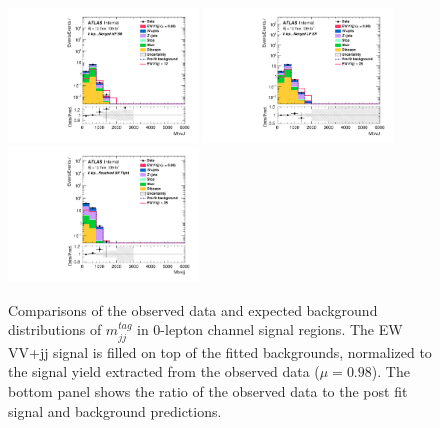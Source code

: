 \begin{figure}[]
    \centering
    \includegraphics[width=0.45\textwidth]{figures/PostFit/Region_distMtvvJ_DSRVBSHP_BMin0_J0_incJet1_L0_T0_incFat1_Y6051_incTag1_Fat1_GlobalFit_unconditionnal_mu1log.pdf}
    \includegraphics[width=0.45\textwidth]{figures/PostFit/Region_distMtvvJ_DSRVBSLP_BMin0_J0_incJet1_L0_T0_incFat1_Y6051_incTag1_Fat1_GlobalFit_unconditionnal_mu1log.pdf}
    \includegraphics[width=0.45\textwidth]{figures/PostFit/Region_distMtvvjj_DSRVBSFid_BMin0_T0_Y6051_incTag1_J2_L0_incJet1_GlobalFit_unconditionnal_mu1log.pdf}
      \caption{Comparisons of the observed data and expected background distributions of $m^{tag}_{jj}$ in 0-lepton channel signal regions. The EW VV+jj signal is filled on top of the fitted backgrounds, normalized to the signal yield extracted from the observed data ($\mu = 0.98$). The bottom panel shows the ratio of the observed data to the post fit signal and background predictions.}
      \label{fig:postSR0lepmvv}
\end{figure}
